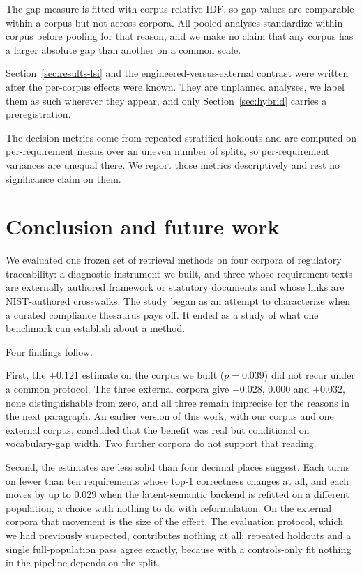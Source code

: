 \documentclass[a4paper,fleqn]{cas-sc}
\begin{document}
The gap measure is fitted with corpus-relative IDF, so gap values are comparable within a corpus but not across corpora. All pooled analyses standardize within corpus before pooling for that reason, and we make no claim that any corpus has a larger absolute gap than another on a common scale.

Section~\ref{sec:results-lsi} and the engineered-versus-external contrast were written after the per-corpus effects were known. They are unplanned analyses, we label them as such wherever they appear, and only Section~\ref{sec:hybrid} carries a preregistration.

The decision metrics come from repeated stratified holdouts and are computed on per-requirement means over an uneven number of splits, so per-requirement variances are unequal there. We report those metrics descriptively and rest no significance claim on them.


\section{Conclusion and future work}
\label{sec:conclusion}

We evaluated one frozen set of retrieval methods on four corpora of regulatory traceability: a diagnostic instrument we built, and three whose requirement texts are externally authored framework or statutory documents and whose links are NIST-authored crosswalks.
The study began as an attempt to characterize when a curated compliance thesaurus pays off. It ended as a study of what one benchmark can establish about a method.

Four findings follow.

First, the $+0.121$ estimate on the corpus we built ($p = 0.039$) did not recur under a common protocol. The three external corpora give $+0.028$, $0.000$ and $+0.032$, none distinguishable from zero, and all three remain imprecise for the reasons in the next paragraph. An earlier version of this work, with our corpus and one external corpus, concluded that the benefit was real but conditional on vocabulary-gap width. Two further corpora do not support that reading.

Second, the estimates are less solid than four decimal places suggest. Each turns on fewer than ten requirements whose top-1 correctness changes at all, and each moves by up to $0.029$ when the latent-semantic backend is refitted on a different population, a choice with nothing to do with reformulation. On the external corpora that movement is the size of the effect. The evaluation protocol, which we had previously suspected, contributes nothing at all: repeated holdouts and a single full-population pass agree exactly, because with a controls-only fit nothing in the pipeline depends on the split.
\end{document}
